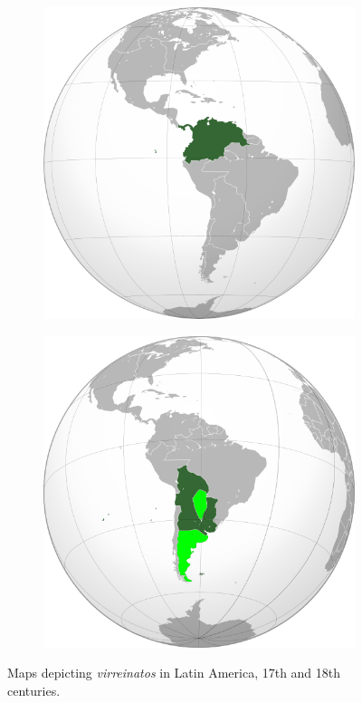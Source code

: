 \documentclass[12pt]{article}
\begin{document}
\begin{figure}[ht]
\begin{subfigure}{0.125\textwidth}
\caption{\label{fig:1b}}
\end{subfigure}
\begin{subfigure}{0.125\textwidth}
\includegraphics[width=\textwidth]{vice_nuevagranada.png}
\caption{\label{fig:1c}}
\end{subfigure}
\begin{subfigure}{0.125\textwidth}
\includegraphics[width=\textwidth]{vice_riodelaplata.png}
\caption{\label{fig:1d}}
\end{subfigure}
\caption{\label{fig:1} Maps depicting \textit{virreinatos} in Latin America, 17th and 18th centuries.}
\end{figure}
\end{document}
